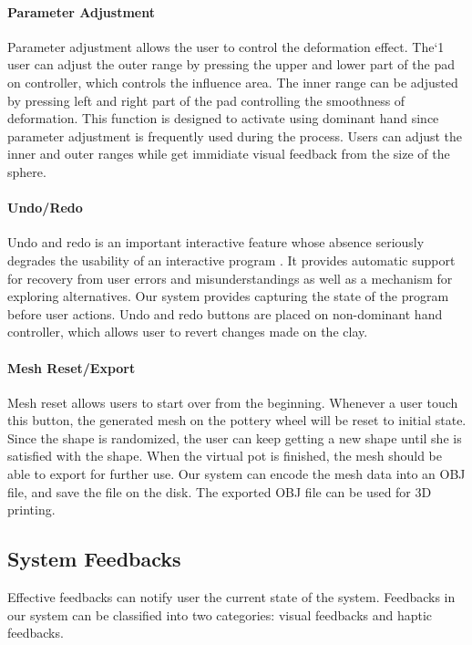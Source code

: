 \documentclass{svjour3}                     %
\begin{document}
\paragraph{Parameter Adjustment}
Parameter adjustment allows the user to control the deformation effect.
The`1 user can adjust the outer range by pressing the upper and lower part of the pad on controller, which controls the influence area. The inner range can be adjusted by pressing left and right part of the pad controlling the smoothness of deformation. This function is designed to activate using dominant hand since parameter adjustment is frequently used during the process. Users can adjust the inner and outer ranges while get immidiate visual feedback from the size of the sphere.

\paragraph{Undo/Redo}
Undo and redo is an important interactive feature whose absence seriously degrades the usability of an interactive program \cite{choudhary1995general}. It provides automatic support for recovery from user errors and misunderstandings as well as a mechanism for exploring alternatives. Our system provides capturing the state of the program before user actions.
Undo and redo buttons are placed on non-dominant hand controller, which allows user to revert changes made on the clay.

\paragraph{Mesh Reset/Export}
Mesh reset allows users to start over from the beginning.
Whenever a user touch this button, the generated mesh on the pottery wheel will be reset to initial state. Since the shape is randomized, the user can keep getting a new shape until she is satisfied with the shape.
When the virtual pot is finished, the mesh should be able to export for further use. Our system can encode the mesh data into an OBJ file, and save the file on the disk. The exported OBJ file can be used for 3D printing.

\subsection{System Feedbacks}
\label{sec:4.4}
Effective feedbacks can notify user the current state of the system. Feedbacks in our system can be classified into two categories: visual feedbacks and haptic feedbacks.
\end{document}
